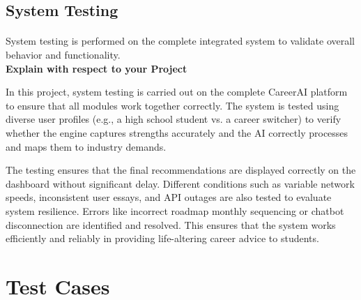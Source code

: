 \subsection{ System Testing}
\paragraph{}System testing is performed on the complete integrated system to validate overall behavior and functionality.\\
\textbf{Explain with respect to your Project}

In this project, system testing is carried out on the complete CareerAI platform to ensure that all modules work together correctly. The system is tested using diverse user profiles (e.g., a high school student vs. a career switcher) to verify whether the engine captures strengths accurately and the AI correctly processes and maps them to industry demands.

The testing ensures that the final recommendations are displayed correctly on the dashboard without significant delay. Different conditions such as variable network speeds, inconsistent user essays, and API outages are also tested to evaluate system resilience. Errors like incorrect roadmap monthly sequencing or chatbot disconnection are identified and resolved. This ensures that the system works efficiently and reliably in providing life-altering career advice to students.
\clearpage
\section{Test Cases}

